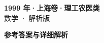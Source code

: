 \documentclass[zihao=-4, a4paper]{ctexart}
\begin{document}
\begin{center}
  {\Large\bfseries 1999 年·上海卷·理工农医类}\\[4pt]
  {\large 数学 · 解析版}
\end{center}
\medskip
{}

\clearpage
{}
\begin{center}{\Large\bfseries 参考答案与详细解析}\end{center}
\medskip

\end{document}
